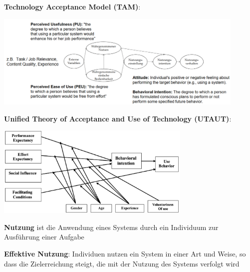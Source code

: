 \textbf{Technology Acceptance Model (TAM)}:
\begin{center}
	\includegraphics[width=0.9\textwidth]{images/tam.png}
\end{center}

\textbf{Unified Theory of Acceptance and Use of Technology (UTAUT)}:
\begin{center}
	\includegraphics[width=0.7\textwidth]{images/utaut.png}
\end{center}

\textbf{Nutzung} ist die Anwendung eines Systems durch ein Individuum zur Ausführung einer Aufgabe

\textbf{Effektive Nutzung}: Individuen nutzen ein System in einer Art und Weise, so dass die Zielerreichung steigt, die mit der Nutzung des Systems verfolgt wird